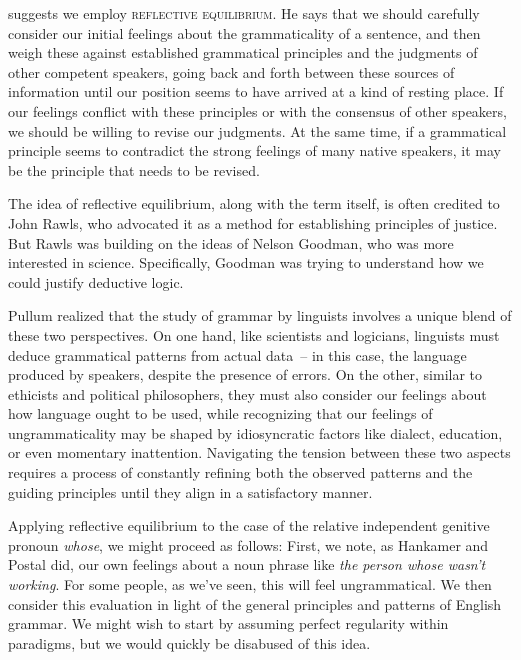 \citet{Pullum2019a} suggests we employ \textsc{reflective equilibrium}. He says that we should carefully consider our initial feelings about the grammaticality of a sentence, and then weigh these against established grammatical principles and the judgments of other competent speakers, going back and forth between these sources of information until our position seems to have arrived at a kind of resting place. If our feelings conflict with these principles or with the consensus of other speakers, we should be willing to revise our judgments. At the same time, if a grammatical principle seems to contradict the strong feelings of many native speakers, it may be the principle that needs to be revised.

The idea of reflective equilibrium, along with the term itself, is often credited to John Rawls, who advocated it as a method for establishing principles of justice. But Rawls was building on the ideas of Nelson Goodman, who was more interested in science. Specifically, Goodman was trying to understand how we could justify deductive logic.

Pullum realized that the study of grammar by linguists involves a unique blend of these two perspectives. On one hand, like scientists and logicians, linguists must deduce grammatical patterns from actual data~-- in this case, the language produced by speakers, despite the presence of errors. On the other, similar to ethicists and political philosophers, they must also consider our feelings about how language ought to be used, while recognizing that our feelings of ungrammaticality may be shaped by idiosyncratic factors like dialect, education, or even momentary inattention. Navigating the tension between these two aspects requires a process of constantly refining both the observed patterns and the guiding principles until they align in a satisfactory manner.

Applying reflective equilibrium to the case of the relative independent genitive pronoun \textit{whose}, we might proceed as follows: First, we note, as Hankamer and Postal did, our own feelings about a noun phrase like \textit{the person whose wasn't working}. For some people, as we've seen, this will feel ungrammatical. We then consider this evaluation in light of the general principles and patterns of English grammar. We might wish to start by assuming perfect regularity within paradigms, but we would quickly be disabused of this idea.

